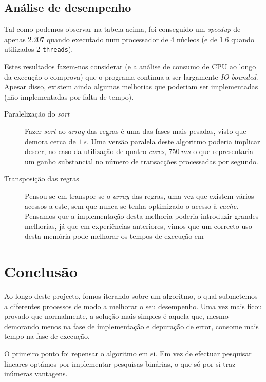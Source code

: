 \documentclass[a4paper]{article}
\begin{document}
\subsection{Análise de desempenho}
\indent \indent Tal como podemos observar na tabela acima, foi conseguido um \textit{speedup} de apenas $2.207$ quando executado num processador de 4 núcleos (e de 1.6 quando utilizados 2 \texttt{threads}).

Estes resultados fazem-nos considerar (e a análise de consumo de CPU ao longo da execução o comprova) que o programa continua a ser largamente \textit{IO bounded}. Apesar disso, existem ainda algumas melhorias que poderiam ser implementadas (não implementadas por falta de tempo).

\begin{description}
	\item [Paralelização do \textit{sort}] Fazer \textit{sort} ao \textit{array} das regras é uma das fases mais pesadas, visto que demora cerca de $1~s$. Uma versão paralela deste algoritmo poderia implicar descer, no caso da utilização de quatro \textit{cores}, $750~ms$ o que representaria um ganho substancial no número de transacções processadas por segundo.

	\item [Transposição das regras] Pensou-se em transpor-se o \textit{array} das regras, uma vez que existem vários acessos a este, sem que nunca se tenha optimizado o acesso à \textit{cache}. Pensamos que a implementação desta melhoria poderia introduzir grandes melhorias, já que em experiências anteriores, vimos que um correcto uso desta memória pode melhorar os tempos de execução em  
\end{description}

\clearpage

\section{Conclusão}
\indent \indent Ao longo deste projecto, fomos iterando sobre um algoritmo, o qual submetemos a diferentes processos de modo a melhorar o seu desempenho. Uma vez mais ficou provado que normalmente, a solução mais simples é aquela que, mesmo demorando menos na fase de implementação e depuração de error, consome mais tempo na fase de execução.

O primeiro ponto foi repensar o algoritmo em si. Em vez de efectuar pesquisar lineares optámos por implementar pesquisas binárias, o que só por si traz inúmeras vantagens.
\end{document}
